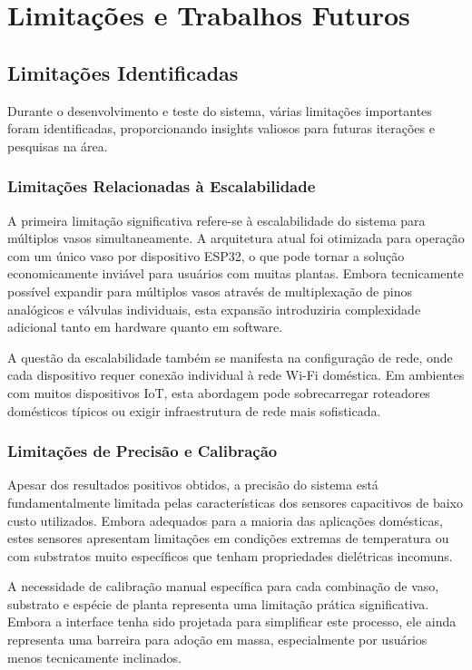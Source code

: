 \documentclass[twoside,english,brazilian]{UNISINOSmonografia}
\begin{document}
\chapter{Limitações e Trabalhos Futuros}

\section{Limitações Identificadas}

Durante o desenvolvimento e teste do sistema, várias limitações importantes foram identificadas, proporcionando insights valiosos para futuras iterações e pesquisas na área.

\subsection{Limitações Relacionadas à Escalabilidade}

A primeira limitação significativa refere-se à escalabilidade do sistema para múltiplos vasos simultaneamente. A arquitetura atual foi otimizada para operação com um único vaso por dispositivo ESP32, o que pode tornar a solução economicamente inviável para usuários com muitas plantas. Embora tecnicamente possível expandir para múltiplos vasos através de multiplexação de pinos analógicos e válvulas individuais, esta expansão introduziria complexidade adicional tanto em hardware quanto em software.

A questão da escalabilidade também se manifesta na configuração de rede, onde cada dispositivo requer conexão individual à rede Wi-Fi doméstica. Em ambientes com muitos dispositivos IoT, esta abordagem pode sobrecarregar roteadores domésticos típicos ou exigir infraestrutura de rede mais sofisticada.

\subsection{Limitações de Precisão e Calibração}

Apesar dos resultados positivos obtidos, a precisão do sistema está fundamentalmente limitada pelas características dos sensores capacitivos de baixo custo utilizados. Embora adequados para a maioria das aplicações domésticas, estes sensores apresentam limitações em condições extremas de temperatura ou com substratos muito específicos que tenham propriedades dielétricas incomuns.

A necessidade de calibração manual específica para cada combinação de vaso, substrato e espécie de planta representa uma limitação prática significativa. Embora a interface tenha sido projetada para simplificar este processo, ele ainda representa uma barreira para adoção em massa, especialmente por usuários menos tecnicamente inclinados.
\end{document}
